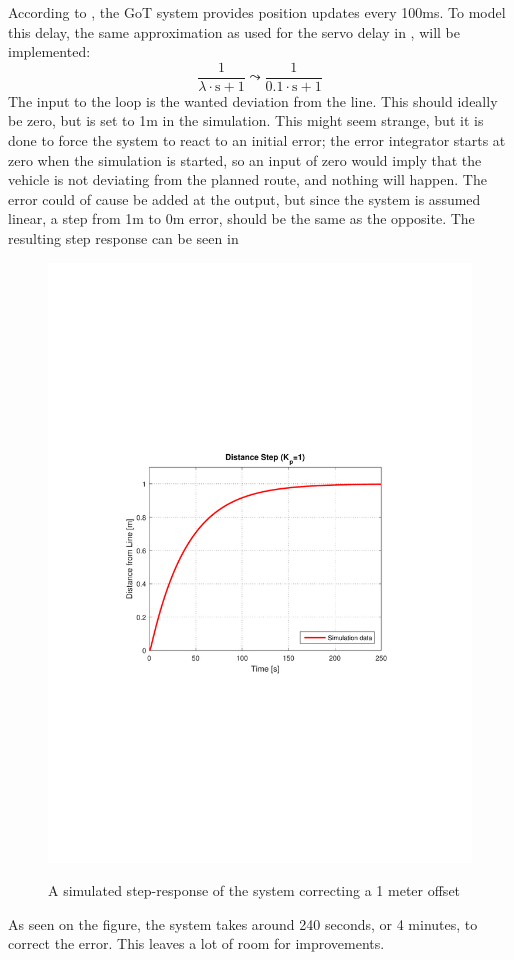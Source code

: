 According to , the GoT system provides position updates every 100ms. To model this delay, the same approximation as used for the servo delay in , will be implemented:
$$\frac{1}{\lambda\cdot\text{s}+1}\leadsto\frac{1}{\SI{0,1}\cdot\text{s}+1}
$$
The input to the loop is the wanted deviation from the line. This should ideally be zero, but is set to 1m in the simulation. This might seem strange, but it is done to force the system to react to an initial error; the error integrator starts at zero when the simulation is started, so an input of zero would imply that the vehicle is not deviating from the planned route, and nothing will happen.
The error could of cause be added at the output, but since the system is assumed linear, a step from 1m to 0m error, should be the same as the opposite.
The resulting step response can be seen in 

\begin{figure}[H]
  \centering
  {
    \includegraphics[width=1.4\textwidth]{figures/distanceStep1.pdf}
  }
  \caption{A simulated step-response of the system correcting a 1 meter offset}
  \label{SimulationSteeringP1}
\end{figure}
As seen on the figure, the system takes around 240 seconds, or 4 minutes, to correct the error. This leaves a lot of room for improvements.

